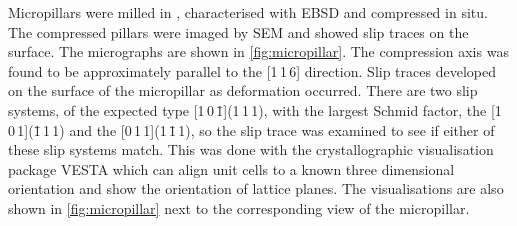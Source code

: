 Micropillars were milled in , characterised with EBSD and compressed in situ. The compressed pillars were imaged by SEM and showed slip traces on the surface. The micrographs are shown in \autoref{fig:micropillar}. The compression axis was found to be approximately parallel to the [1\,1\,6] direction. Slip traces developed on the surface of the micropillar as deformation occurred. There are two slip systems, of the expected type [1\,0\,\={1}](1\,1\,1), with the largest Schmid factor, the [1\,0\,1](\={1}\,1\,1) and the [0\,1\,1](1\,\={1}\,1), so the slip trace was examined to see if either of these slip systems match. This was done with the crystallographic visualisation package VESTA \cite{Momma2011,Momma2014} which can align unit cells to a known three dimensional orientation and show the orientation of lattice planes. The visualisations are also shown in \autoref{fig:micropillar} next to the corresponding view of the micropillar.

